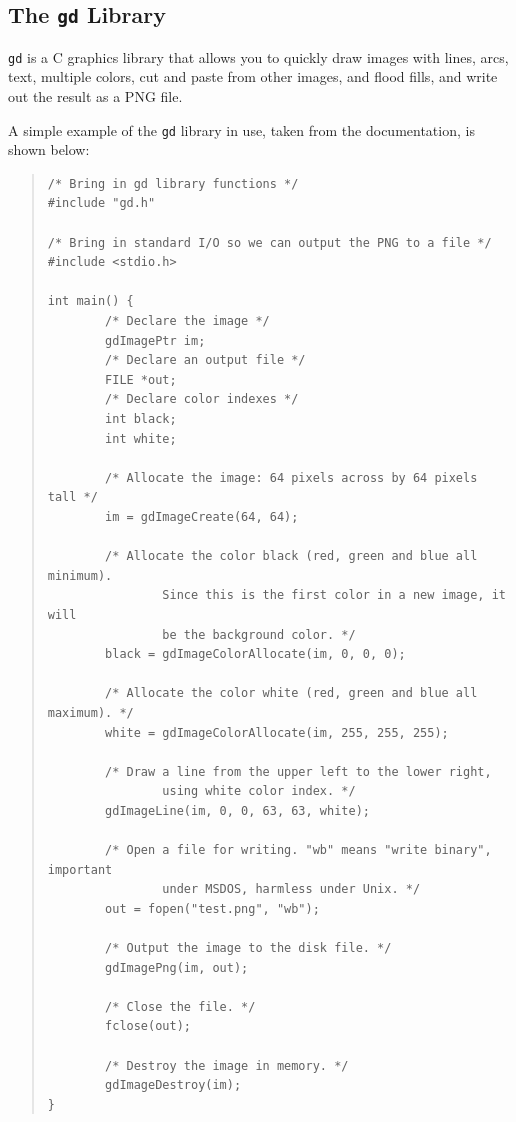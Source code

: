 \documentclass[twoside,11pt]{article}
\newcommand{\htmladdnormallink}[2]{#1}
\newcommand{\htmlref}[2]{#1}
\newcommand{\xlabel}[1]{}
\begin{document}
\subsection{\xlabel{sc15_gd}The {\tt gd} Library\label{sc15_gd}}

\htmladdnormallink{{\tt gd}}{http://www.boutell.com/gd/gd.html} is a C graphics library that allows you to quickly draw images with lines, arcs, text, multiple colors, cut and paste from other images, and flood fills, and write out the result as a \htmlref{PNG}{sc15_libpng} file.

A simple example of the {\tt gd} library in use, taken from the documentation, is shown below:

\small
\begin{quote}
\begin{verbatim}
/* Bring in gd library functions */
#include "gd.h"

/* Bring in standard I/O so we can output the PNG to a file */
#include <stdio.h>

int main() {
        /* Declare the image */
        gdImagePtr im;
        /* Declare an output file */
        FILE *out;
        /* Declare color indexes */
        int black;
        int white;

        /* Allocate the image: 64 pixels across by 64 pixels tall */
        im = gdImageCreate(64, 64);

        /* Allocate the color black (red, green and blue all minimum).
                Since this is the first color in a new image, it will
                be the background color. */
        black = gdImageColorAllocate(im, 0, 0, 0);      

        /* Allocate the color white (red, green and blue all maximum). */
        white = gdImageColorAllocate(im, 255, 255, 255);        
        
        /* Draw a line from the upper left to the lower right,
                using white color index. */
        gdImageLine(im, 0, 0, 63, 63, white);   

        /* Open a file for writing. "wb" means "write binary", important
                under MSDOS, harmless under Unix. */
        out = fopen("test.png", "wb");

        /* Output the image to the disk file. */
        gdImagePng(im, out);    

        /* Close the file. */
        fclose(out);

        /* Destroy the image in memory. */
        gdImageDestroy(im);
}
\end{verbatim}
\end{quote}
\normalsize
\end{document}
